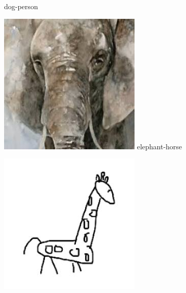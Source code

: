 \documentclass{article}
\begin{document}
\begin{center}
\begin{minipage}{0.142\textwidth}
        dog-person
    \end{minipage}%
    \begin{minipage}{0.142\textwidth}
        \includegraphics[width=\linewidth]{./pic/misclassified_r1_p4_2723.jpg}
        elephant-horse
    \end{minipage}%
    \begin{minipage}{0.142\textwidth}
        \includegraphics[width=\linewidth]{./pic/misclassified_r2_p0_2723.jpg}

\end{minipage}
\end{center}
\end{document}
